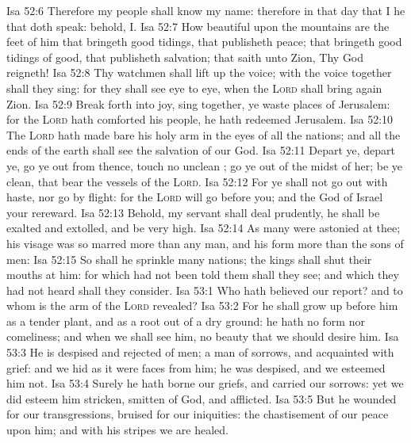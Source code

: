 \vs Isa 52:6 Therefore my people shall know my name: therefore  in that day that I  he that doth speak: behold,  I.
\vs Isa 52:7 How beautiful upon the mountains are the feet of him that bringeth good tidings, that publisheth peace; that bringeth good tidings of good, that publisheth salvation; that saith unto Zion, Thy God reigneth!
\vs Isa 52:8 Thy watchmen shall lift up the voice; with the voice together shall they sing: for they shall see eye to eye, when the \textsc{Lord} shall bring again Zion.
\vs Isa 52:9 Break forth into joy, sing together, ye waste places of Jerusalem: for the \textsc{Lord} hath comforted his people, he hath redeemed Jerusalem.
\vs Isa 52:10 The \textsc{Lord} hath made bare his holy arm in the eyes of all the nations; and all the ends of the earth shall see the salvation of our God.
\vs Isa 52:11 Depart ye, depart ye, go ye out from thence, touch no unclean ; go ye out of the midst of her; be ye clean, that bear the vessels of the \textsc{Lord}.
\vs Isa 52:12 For ye shall not go out with haste, nor go by flight: for the \textsc{Lord} will go before you; and the God of Israel  your rereward.
\vs Isa 52:13 Behold, my servant shall deal prudently, he shall be exalted and extolled, and be very high.
\vs Isa 52:14 As many were astonied at thee; his visage was so marred more than any man, and his form more than the sons of men:
\vs Isa 52:15 So shall he sprinkle many nations; the kings shall shut their mouths at him: for  which had not been told them shall they see; and  which they had not heard shall they consider.
\vs Isa 53:1 Who hath believed our report? and to whom is the arm of the \textsc{Lord} revealed?
\vs Isa 53:2 For he shall grow up before him as a tender plant, and as a root out of a dry ground: he hath no form nor comeliness; and when we shall see him,  no beauty that we should desire him.
\vs Isa 53:3 He is despised and rejected of men; a man of sorrows, and acquainted with grief: and we hid as it were  faces from him; he was despised, and we esteemed him not.
\vs Isa 53:4 Surely he hath borne our griefs, and carried our sorrows: yet we did esteem him stricken, smitten of God, and afflicted.
\vs Isa 53:5 But he  wounded for our transgressions,  bruised for our iniquities: the chastisement of our peace  upon him; and with his stripes we are healed.
